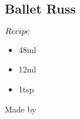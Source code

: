 \subsection{Ballet Russ}
\vspace{-7.5mm}
\hspace{32mm}
\vspace{2.5mm}
\begin{itembox}[l]{\boldmath $Recipe$}
\begin{itemize}
\setlength{\parskip}{0cm}
\setlength{\itemsep}{0cm}
\item \vodka 48ml
\item \cc 12ml
\item \lj 1tsp
\end{itemize}
\vspace{-4mm}
Made by \shake
\end{itembox}
